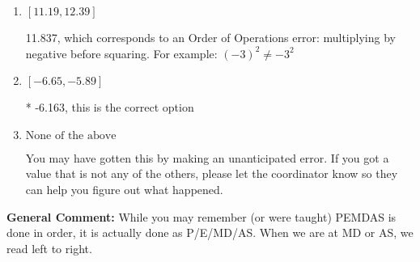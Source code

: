 \documentclass{extbook}[14pt]
\begin{document}
\begin{enumerate}
{\begin{enumerate}[label=\Alph*.]
 11.003, which corresponds to two Order of Operations errors.
\item \( [11.19, 12.39] \)

 11.837, which corresponds to an Order of Operations error: multiplying by negative before squaring. For example: $(-3)^2 \neq -3^2$
\item \( [-6.65, -5.89] \)

* -6.163, this is the correct option
\item \( \text{None of the above} \)

 You may have gotten this by making an unanticipated error. If you got a value that is not any of the others, please let the coordinator know so they can help you figure out what happened.
\end{enumerate}

\textbf{General Comment:} While you may remember (or were taught) PEMDAS is done in order, it is actually done as P/E/MD/AS. When we are at MD or AS, we read left to right.
}
\end{enumerate}
\end{document}
